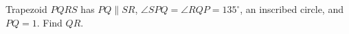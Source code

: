 Trapezoid $PQRS$ has $PQ\parallel SR$, $\angle SPQ=\angle RQP=135^\circ$, an inscribed circle, and $PQ=1$. Find $QR$.
